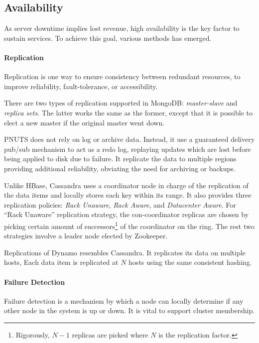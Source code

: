 \documentclass[12pt,letter]{article}
\begin{document}
\subsection{Availability}
As server downtime implies lost revenue, high availability is the key factor to sustain services. To achieve this goal, various methods has emerged.

\paragraph*{Replication}
Replication is one way to ensure consistency between redundant resources, to improve reliability, fault-tolerance, or accessibility. 

There are two types of replication supported in MongoDB: \textit{master-slave} and \textit{replica sets}.\citep{Suter2012} The latter works the same as the former, except that it is possible to elect a new master if the original master went down.

PNUTS does not rely on log or archive data. Instead, it use a guaranteed delivery pub/sub mechanism to act as a redo log, replaying updates which are lost before being applied to disk due to failure. It replicate the data to multiple regions providing additional reliability, obviating the need for archiving or backups.

Unlike HBase, Cassandra uses a coordinator node in charge of the replication of the data items and locally stores each key within its range. It also provides three replication policies: \textit{Rack Unaware}, \textit{Rack Aware}, and \textit{Datacenter Aware}. For ``Rack Unaware'' replication strategy, the con-coordinator replicas are chosen by picking certain amount of successors\footnote{Rigorously, $N-1$ replicas are picked where $N$ is the replication factor.} of the coordinator on the ring. The rest two strategies involve a leader node elected by Zookeeper.\citep{Hunt2010}

Replications of Dynamo\citep{DeCandia2007} resembles Cassandra. It replicates its data on multiple hosts, Each data item is replicated at $N$ hosts using the same consistent hashing. 


\paragraph*{Failure Detection}
Failure detection is a mechanism by which a node can locally determine if any other node in the system is up or down. It is vital to support cluster membership.
\end{document}
